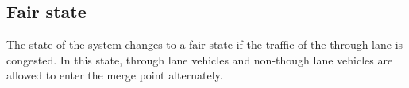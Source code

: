 \documentclass[10pt, conference, compsocconf]{IEEEtran}
\begin{document}

\subsection{Fair state}
The state of the system changes to a fair state if the traffic of the through lane is congested. 
In this state, through lane vehicles and non-though lane vehicles are allowed to enter the merge point alternately.








\end{document}
